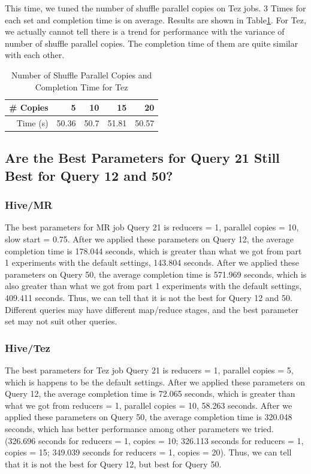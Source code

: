 \documentclass[10pt]{article}
\begin{document}
This time, we tuned the number of shuffle parallel copies on Tez jobs. 3 Times for each set and completion time is on average. Results are shown in Table\ref{tab:num_shuffle_parallel_tez}. For Tez, we actually cannot tell there is a trend for performance with the variance of number of shuffle parallel copies. The completion time of them are quite similar with each other. 

\begin{table}[htbp]
  \centering
  \caption{Number of Shuffle Parallel Copies and Completion Time for Tez}
    \begin{tabular}{rrrrr}
    \toprule
    \# Copies & 5     & 10    & 15    & 20 \\
    \midrule
    Time (s) & 50.36 & 50.7  & 51.81 & 50.57 \\
    \bottomrule
    \end{tabular}%
  \label{tab:num_shuffle_parallel_tez}%
\end{table}%


\subsection{Are the Best Parameters for Query 21 Still Best for Query 12 and 50?}

\subsubsection{Hive/MR}

The best parameters for MR job Query 21 is reducers = 1, parallel copies = 10, slow start = 0.75. After we applied these parameters on Query 12, the average completion time is 178.044 seconds, which is greater than what we got from part 1 experiments with the default settings, 143.804 seconds. After we applied these parameters on Query 50, the average completion time is 571.969 seconds, which is also greater than what we got from part 1 experiments with the default settings, 409.411 seconds. Thus, we can tell that it is not the best for Query 12 and 50. Different queries may have different map/reduce stages, and the best parameter set may not suit other queries.


\subsubsection{Hive/Tez}

The best parameters for Tez job Query 21 is reducers = 1, parallel copies = 5, which is happens to be the default settings. After we applied these parameters on Query 12, the average completion time is 72.065 seconds, which is greater than what we got from reducers = 1, parallel copies = 10, 58.263 seconds. After we applied these parameters on Query 50, the average completion time is 320.048 seconds, which has better performance among other parameters we tried. (326.696 seconds for reducers = 1, copies = 10; 326.113 seconds for reducers = 1, copies = 15; 349.039 seconds for reducers = 1, copies = 20). Thus, we can tell that it is not the best for Query 12, but best for Query 50.
\end{document}

